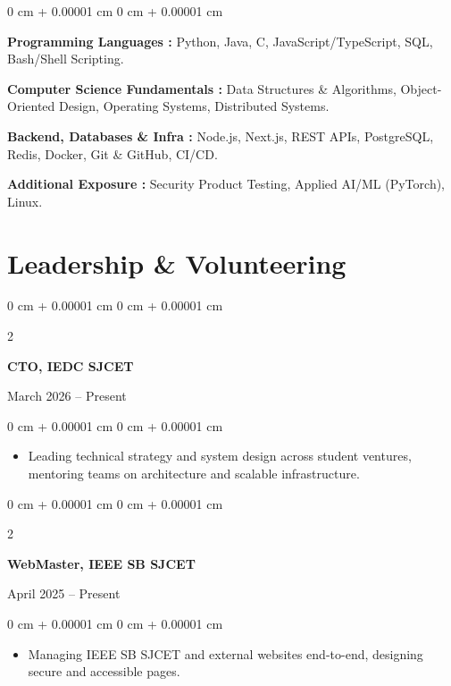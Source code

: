\documentclass[10pt, a4paper]{article}
\newenvironment{highlights}{
    \begin{itemize}[
        topsep=0.10 cm,
        parsep=0.10 cm,
        partopsep=0pt,
        itemsep=0pt,
        leftmargin=0 cm + 10pt
    ]
}{
    \end{itemize}
} %
\newenvironment{onecolentry}{
    \begin{adjustwidth}{
        0 cm + 0.00001 cm
    }{
        0 cm + 0.00001 cm
    }
}{
    \end{adjustwidth}
} %
\newenvironment{twocolentry}[2][]{
    \onecolentry
    \def\secondColumn{#2}
    \setcolumnwidth{\fill, 4.5 cm}
    \begin{paracol}{2}
}{
    \switchcolumn \raggedleft \secondColumn
    \end{paracol}
    \endonecolentry
} %
\begin{document}
    \begin{onecolentry}

        \textbf{Programming Languages :} Python, Java, C, JavaScript/TypeScript, SQL, Bash/Shell Scripting.

        \vspace{0.1 cm}

        \textbf{Computer Science Fundamentals :} Data Structures \& Algorithms, Object-Oriented Design, Operating Systems, Distributed Systems.

        \vspace{0.1 cm}

        \textbf{Backend, Databases \& Infra :} Node.js, Next.js, REST APIs, PostgreSQL, Redis, Docker, Git \& GitHub, CI/CD.

        \vspace{0.1 cm}

        \textbf{Additional Exposure :} Security Product Testing, Applied AI/ML (PyTorch), Linux.

    \end{onecolentry}

    \section{Leadership \& Volunteering}

    \vspace{0.2 cm}

\begin{twocolentry}{
    March 2026 – Present
}
    \textbf{CTO, IEDC SJCET}
\end{twocolentry}

\vspace{0.10 cm}
\begin{onecolentry}
    \begin{highlights}
        \item Leading technical strategy and system design across student ventures, mentoring teams on architecture and scalable infrastructure.
    \end{highlights}
\end{onecolentry}

\vspace{0.2 cm}

\begin{twocolentry}{
    April 2025 – Present
}
    \textbf{WebMaster, IEEE SB SJCET}
\end{twocolentry}

\vspace{0.10 cm}
\begin{onecolentry}
    \begin{highlights}
        \item Managing IEEE SB SJCET and external websites end-to-end, designing secure and accessible pages.
    \end{highlights}
\end{onecolentry}
\end{document}
